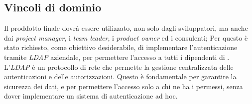 \subsection*{ Vincoli di dominio}
Il proddotto finale dovrà essere utilizzato, non solo dagli sviluppatori, ma anche dai \textit{project manager}, i \textit{team leader},
 i \textit{product owner} ed i consulenti; 
 Per questo è stato richiesto, come obiettivo desiderabile, di implementare l'autenticazione tramite \textit{LDAP} aziendale, 
per permettere l'accesso a tutti i dipendenti di {\azienda}.\\
L'\textit{LDAP} è un protocollo di rete che permette la gestione centralizzata delle autenticazioni e delle autorizzazioni.
Questo è fondamentale per garantire la sicurezza dei dati, e per permettere l'accesso solo a chi ne ha i permessi, senza dover
implementare un sistema di autenticazione ad hoc.\\
